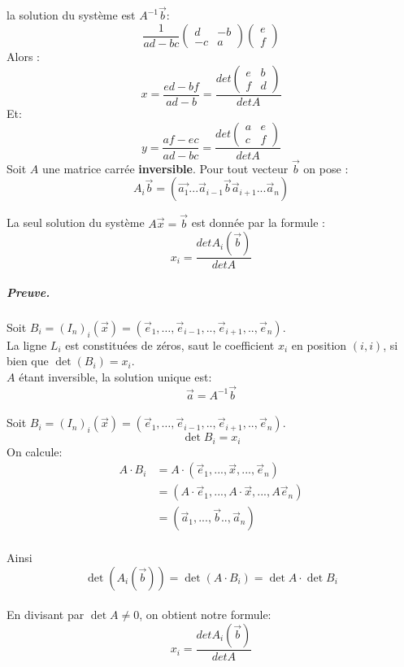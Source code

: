 la solution du système est $A^{-1}\vec{b}$: 
\[\frac{1}{ad -bc}\begin{pmatrix}
    d & -b \\
    -c & a
\end{pmatrix}
\begin{pmatrix}
    e \\
    f
\end{pmatrix}\]
Alors : 
\[x = \frac{ed -bf}{ad -b} =  \frac{det\begin{pmatrix}
    e & b \\
    f & d
\end{pmatrix}} {det A}\]
Et:
\[
y = \frac{af - ec}{ad - bc} = \frac{det \begin{pmatrix}
    a & e \\
    c & f
\end{pmatrix}}{det A}
\]
Soit $A$ une matrice carrée \textbf{inversible}. Pour tout vecteur $\vec{b}$ on pose :
\[A_i\vec{b} = (\vec{a_1}... \vec{a}_{i-1} \vec{b} \vec{a}_{i+ 1} ... \vec{a}_n)\]

    La seul solution du système $A\vec{x} = \vec{b}$ est donnée par la formule : 
    \[
    x_i = \frac{detA_i(\vec{b})}{det A}
    \]
\subparagraph{Preuve.}
Soit $B_i = (I_n)_i(\vec{x}) = (\vec{e}_1,\dots, \vec{e}_{i-1}, .., \vec{e}_{i+1}, .., \vec{e}_n  )$.
\\
La ligne $L_i$ est constituées de zéros, saut le coefficient $x_i$ en position $(i, i)$, si bien que $\det (B_i) = x_i$.
\\
$A$ étant inversible, la solution unique est:
\[\vec{a} = A^{-1}\vec{b}\]
\\
Soit $B_i = (I_n)_i(\vec{x}) = (\vec{e}_1,\dots, \vec{e}_{i-1}, .., \vec{e}_{i+1}, .., \vec{e}_n)$.
\\
\[\det B_i = x_i\]
On calcule:
\\
\begin{align*}
A\cdot B_i &= A\cdot(\vec{e}_1, ..., \vec{x}, ..., \vec{e}_n)\\
&= (A\cdot\vec{e}_1, ..., A\cdot\vec{x}, ..., A\vec{e}_n)\\
&= (\vec{a}_1, ..., \vec{b} .., \vec{a}_n)    
\end{align*}
\\
Ainsi \[\det(A_i(\vec{b})) = \det(A\cdot B_i) = \det A \cdot \det B_i\]
\\
En divisant par $\det A \neq 0$, on obtient notre formule:
    \[
    x_i = \frac{detA_i(\vec{b})}{det A}
    \]